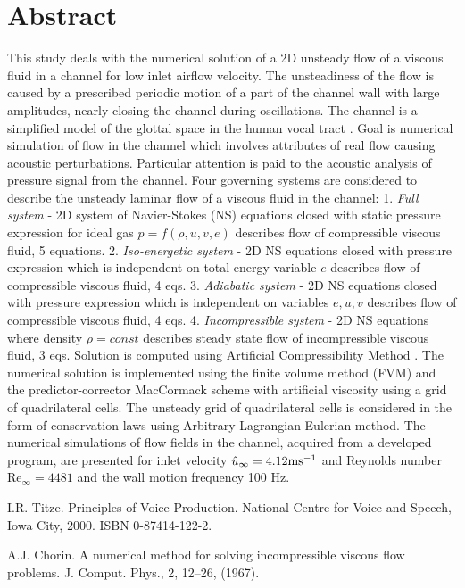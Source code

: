\documentclass[article, A4, 11pt]{llncs}%
\begin{document}
\section*{Abstract}
This study deals with the numerical solution of a 2D unsteady flow of a viscous fluid in a channel for low inlet airflow velocity. The unsteadiness of the flow is caused by a prescribed periodic motion of a part of the channel wall with large amplitudes, nearly closing the channel during oscillations. The channel is a simplified model of the glottal space in the human vocal tract \cite{Principles of Voice Production}. Goal is numerical simulation of flow in the channel which involves attributes of real flow causing acoustic perturbations. Particular attention is paid to the acoustic analysis of pressure signal from the channel. Four governing systems are considered to describe the unsteady laminar flow of a viscous fluid in the channel: 1. {\it Full system} - 2D system of Navier-Stokes (NS) equations closed with static pressure expression for ideal gas $p=f(\rho, u, v, e)$ describes flow of compressible viscous fluid, 5 equations. 2. {\it Iso-energetic system} - 2D NS equations closed with pressure expression which is independent on total energy variable $e$ describes flow of compressible viscous fluid, 4 eqs. 3. {\it Adiabatic system} - 2D NS equations closed with pressure expression which is independent on variables $e,u,v$ describes flow of compressible viscous fluid, 4 eqs. 4. {\it Incompressible system} - 2D NS equations where density $\rho=const$ describes steady state flow of incompressible viscous fluid, 3 eqs. Solution is computed using Artificial Compressibility Method \cite{A numerical method for solving incompressible viscous flow problems}. The numerical solution is implemented using the finite volume method (FVM) and the predictor-corrector MacCormack scheme with artificial viscosity using a grid of quadrilateral cells. The unsteady grid of quadrilateral cells is considered in the form of conservation laws using Arbitrary Lagrangian-Eulerian method. The numerical simulations of flow fields in the channel, acquired from a developed program, are presented for inlet velocity $\hat u_{\infty}=4.12 {\rm ms^{-1}}$ and Reynolds number Re$_{\infty} = 4481$ and the wall motion frequency 100 Hz.


\begin{thebibliography}{10}
{\sc I.R. Titze}. {Principles of Voice Production}. National Centre for Voice and Speech, Iowa City, 2000. ISBN 0-87414-122-2.

{\sc A.J. Chorin}. {A numerical method for solving incompressible viscous flow problems}. J. Comput. Phys., 2, 12–26, (1967).
\end{thebibliography} %
\end{document}
